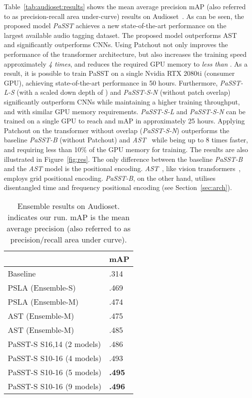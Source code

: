 \documentclass[a4paper]{article}
\begin{document}
Table~\ref{tab:audioset:results} shows the mean average precision mAP (also referred to as precision-recall area under-curve) results on Audioset~\cite{audioset2017Gemmeke}. As can be seen, the proposed model \emph{PaSST} achieves a new state-of-the-art performance on the largest available audio tagging dataset. The proposed model outperforms AST~\cite{gong21ast} and significantly outperforms CNNs. Using Patchout not only improves the performance of the transformer architecture, but also increases the training speed approximately \emph{4 times}, and reduces the required GPU memory to \emph{less than }. As a result, it is possible to train PaSST on a single Nvidia RTX 2080ti (consumer GPU), achieving state-of-the-art performance in 50 hours. Furthermore, \emph{PaSST-L-S} (with a scaled down depth of ) and \emph{PaSST-S-N } (without patch overlap) significantly outperform CNNs while maintaining a higher training throughput, and with similar GPU memory requirements. \emph{PaSST-S-L} and \emph{PaSST-S-N } can be trained on a single GPU to reach  and   mAP in approximately 25 hours. 
Applying Patchout on the transformer without overlap (\emph{PaSST-S-N}) outperforms the baseline \emph{PaSST-B} (without Patchout) and \emph{AST}~\cite{gong21ast} while being up to 8 times faster, and requiring less than 10\% of the GPU memory for training. The results are also illustrated in Figure~\ref{fig:res}. The only difference between the baseline \emph{PaSST-B}  and the \emph{AST} model is the positional encoding. \emph{AST}~\cite{gong21ast}, like vision transformers~\cite{dosovitskiyB0WZ21VIT,TouvronCDMSJ21deit}, employs grid positional encoding. \emph{PaSST-B}, on the other hand, utilises disentangled time and frequency positional encoding (see Section~\ref{sec:arch}).



\begin{table}[hbt]
\centering
\begin{tabular}{l|l}
     & mAP  \\ \hline
Baseline~\cite{audioset2017Gemmeke} & .314   \\ \hline
PSLA (Ensemble-S)~\cite{gong_psla}& .469 \\
PSLA (Ensemble-M)~\cite{gong_psla}& .474 \\
AST (Ensemble-M) ~\cite{gong21ast}  & .475       \\  AST (Ensemble-M) ~\cite{gong21ast}  & .485       \\ \hline PaSST-S S16,14 (2 models) & .486  \\
PaSST-S S10-16 (4 models) & .493  \\
PaSST-S S10-16  (5 models)  &\textbf{ .495}  \\
PaSST-S S10-16  (9 models) &\textbf{ .496}  \\
\hline 
\end{tabular}
\caption{Ensemble results on Audioset.  indicates our run. mAP is the mean average precision (also referred to as precision/recall area under curve). }
\label{tab:audioset:results_ens}
\end{table}
\end{document}
